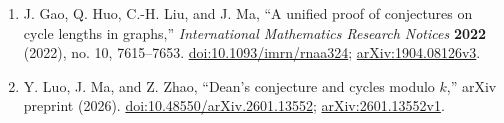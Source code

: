 \documentclass[
  11pt]{article}
\begin{document}
\begin{enumerate}
  \emph{Discrete Mathematics} \textbf{121} (1993), nos. 1--3, 37--49.
  \href{https://doi.org/10.1016/0012-365X(93)90535-2}{doi:10.1016/0012-365X(93)90535-2}.
\item
  \label{ref-gao-huo-liu-ma-2022}{}J. Gao, Q. Huo, C.-H.
  Liu, and J. Ma, ``A unified proof of conjectures on cycle lengths in
  graphs,'' \emph{International Mathematics Research Notices}
  \textbf{2022} (2022), no. 10, 7615--7653.
  \href{https://doi.org/10.1093/imrn/rnaa324}{doi:10.1093/imrn/rnaa324};
  \href{https://arxiv.org/abs/1904.08126v3}{arXiv:1904.08126v3}.
\item
  \label{ref-luo-ma-zhao-2026}{}Y. Luo, J. Ma, and Z.
  Zhao, ``Dean's conjecture and cycles modulo \(k\),'' arXiv preprint
  (2026).
  \href{https://doi.org/10.48550/arXiv.2601.13552}{doi:10.48550/arXiv.2601.13552};
  \href{https://arxiv.org/abs/2601.13552v1}{arXiv:2601.13552v1}.
\end{enumerate}

\endgroup
\end{document}
